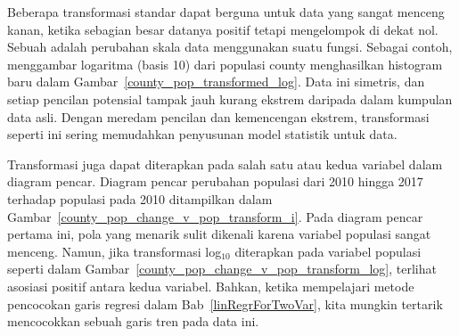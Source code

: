 Beberapa transformasi standar dapat berguna untuk data yang sangat
menceng kanan, ketika sebagian besar datanya positif tetapi
mengelompok di dekat nol.
Sebuah  adalah perubahan skala data menggunakan suatu
fungsi. Sebagai contoh, menggambar logaritma (basis 10) dari
populasi county menghasilkan histogram baru dalam
Gambar~\ref{county_pop_transformed_log}.
Data ini simetris, dan setiap pencilan potensial tampak jauh kurang
ekstrem daripada dalam kumpulan data asli.
Dengan meredam pencilan dan kemencengan ekstrem, transformasi
seperti ini sering memudahkan penyusunan model statistik untuk data.

Transformasi juga dapat diterapkan pada salah satu atau kedua
variabel dalam diagram pencar.
Diagram pencar perubahan populasi dari 2010 hingga 2017 terhadap
populasi pada 2010 ditampilkan dalam
Gambar~\ref{county_pop_change_v_pop_transform_i}.
Pada diagram pencar pertama ini, pola yang menarik sulit dikenali
karena variabel populasi sangat menceng.
Namun, jika transformasi log$_{10}$ diterapkan pada variabel
populasi seperti dalam
Gambar~\ref{county_pop_change_v_pop_transform_log}, terlihat
asosiasi positif antara kedua variabel.
Bahkan, ketika mempelajari metode pencocokan garis regresi dalam
Bab~\ref{linRegrForTwoVar}, kita mungkin tertarik mencocokkan
sebuah garis tren pada data ini.

